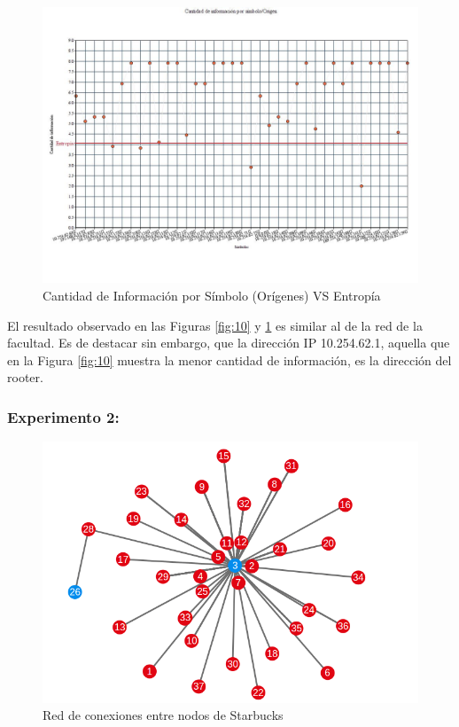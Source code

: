 \begin{figure}[H]
  \centering
    \includegraphics[scale=0.45]{imagenes/graficos/entropiaCantInf/04origen.jpg}
  \caption{Cantidad de Información por Símbolo (Orígenes) VS Entropía}
  \label{fig:11}
\end{figure}

El resultado observado en las Figuras \ref{fig:10} y \ref{fig:11} es similar al de la red de la facultad. Es de destacar sin embargo, que la dirección IP 10.254.62.1, aquella que en la Figura \ref{fig:10} muestra la menor cantidad de información, es la dirección del rooter.

\subsubsection{Experimento 2:}

\begin{figure}[H]
  \centering
    \includegraphics[scale=0.45]{imagenes/graficos/grafos/starbucks.png}
  \caption{Red de conexiones entre nodos de Starbucks}
  \label{fig:12}
\end{figure}

